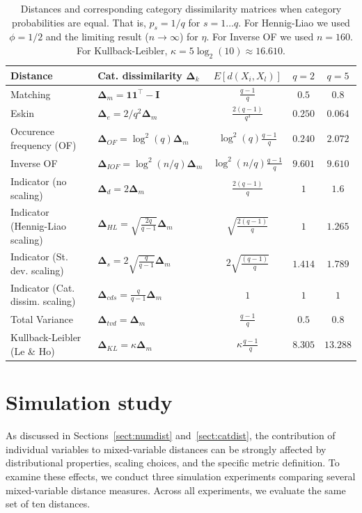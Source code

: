 \documentclass[12pt]{article}
\begin{document}
\begin{table}[!ht]
\caption{Distances and corresponding category dissimilarity matrices when category probabilities are equal. That is, $p_s=1/q$ for $s=1 \dots q$. For Hennig-Liao we used $\phi=1/2$ and the limiting result ($n \to \infty$) for $\eta$. For Inverse OF we used $n=160$. For Kullback-Leibler, $\kappa=5\log_2(10) \approx 16.610$.}
\label{table:expectedvalues}
\centering
\begin{tabular}{llccc}
\toprule
Distance & Cat. dissimilarity $\bm{\Delta}_k$ & $E[d(X_{i}, X_{l})] $&  $ q=2$  & $ q=5  $\\ \midrule
Matching  & $\bm{\Delta}_m = \mathbf{1} \mathbf{1}^{\top} - \mathbf{I}$  & $\frac{q-1}{q}$ & $0.5$ & $0.8$\\
Eskin & $\bm{\Delta}_e = 2/q^2\bm{\Delta}_m$ & $\frac{2(q-1)}{q^3}$ & $0.250$ & $0.064$ \\
Occurence frequency (OF) & $\bm{\Delta}_{OF} = \log^2(q)\bm{\Delta}_m$ & $\log^2(q)\frac{q-1}{q}$ & $0.240$ &  $2.072$\\
Inverse OF & $\bm{\Delta}_{IOF} = \log^2(n/q) \bm{\Delta}_m$ & $\log^2(n/q)\frac{q-1}{q}$ & $9.601$ & $9.610$ \\ \midrule
Indicator (no scaling) & $\bm{\Delta}_{d}=2\bm{\Delta}_m$ & $\frac{2(q-1)}{q}$ &$1$ & $1.6$\\
Indicator (Hennig-Liao scaling) & $\bm{\Delta}_{HL} = \sqrt{\frac{2q}{q-1}}\bm{\Delta}_m$ & $\sqrt{\frac{2(q-1)}{q}}$ &$1$ & $1.265$\\
Indicator (St. dev. scaling) & $\bm{\Delta}_{s}=2\sqrt{\frac{q}{q-1}}\bm{\Delta}_m$ &  $2\sqrt{\frac{(q-1)}{q}}$ & $1.414$ & $1.789$\\
Indicator (Cat. dissim. scaling) & $\bm{\Delta}_{cds}=\frac{q}{q-1}\bm{\Delta}_m $ & $1$ &$1$&$1$\\ \midrule
Total Variance  & $\bm{\Delta}_{tvd} = \bm{\Delta}_m$  & $\frac{q-1}{q}$ & $0.5$ & $0.8$\\
Kullback-Leibler (Le \& Ho) & $\bm{\Delta}_{KL} = \kappa\bm{\Delta}_m$ & $\kappa\frac{q-1}{q}$ & $8.305$ & $13.288$ \\
\bottomrule
\end{tabular}
\end{table}

\section{Simulation study}\label{sect:simulation}
As discussed in Sections~\ref{sect:numdist} and~\ref{sect:catdist}, the contribution of individual variables to mixed-variable distances can be strongly affected by distributional properties, scaling choices, and the specific metric definition. To examine these effects, we conduct three simulation experiments comparing several mixed-variable distance measures. Across all experiments, we evaluate the same set of ten distances.
\end{document}
